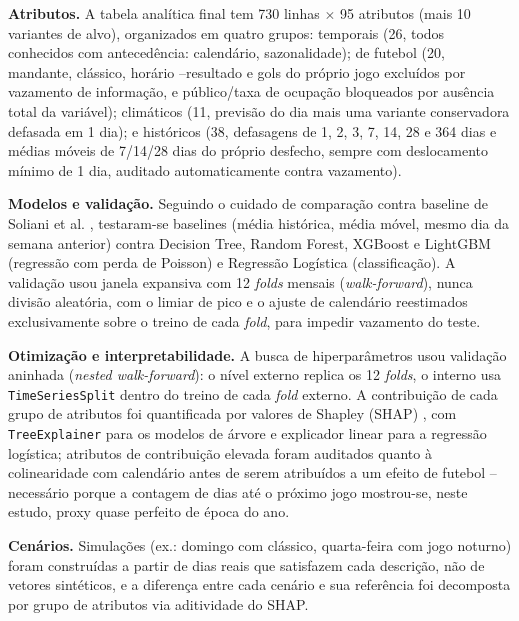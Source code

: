 \textbf{Atributos.} A tabela analítica final tem 730 linhas $\times$ 95
atributos (mais 10 variantes de alvo), organizados em quatro grupos:
temporais (26, todos conhecidos com antecedência: calendário,
sazonalidade); de futebol (20, mandante, clássico, horário --resultado e
gols do próprio jogo excluídos por vazamento de informação, e
público/taxa de ocupação bloqueados por ausência total da variável);
climáticos (11, previsão do dia mais uma variante conservadora defasada
em 1 dia); e históricos (38, defasagens de 1, 2, 3, 7, 14, 28 e 364 dias e
médias móveis de 7/14/28 dias do próprio desfecho, sempre com
deslocamento mínimo de 1 dia, auditado automaticamente contra
vazamento).

\textbf{Modelos e validação.} Seguindo o cuidado de comparação contra
baseline de Soliani et al. \cite{soliani2024}, testaram-se baselines
(média histórica, média móvel, mesmo dia da semana anterior) contra
Decision Tree, Random Forest, XGBoost \cite{chen2016} e LightGBM
(regressão com perda de Poisson) e Regressão Logística (classificação).
A validação usou janela expansiva com 12 \emph{folds} mensais
(\emph{walk-forward}), nunca divisão aleatória, com o limiar de pico e o
ajuste de calendário reestimados exclusivamente sobre o treino de cada
\emph{fold}, para impedir vazamento do teste.

\textbf{Otimização e interpretabilidade.} A busca de hiperparâmetros usou
validação aninhada (\emph{nested walk-forward}): o nível externo replica
os 12 \emph{folds}, o interno usa \texttt{TimeSeriesSplit} dentro do
treino de cada \emph{fold} externo. A contribuição de cada grupo de
atributos foi quantificada por valores de Shapley (SHAP)
\cite{lundberg2017}, com \texttt{TreeExplainer} para os modelos de árvore
e explicador linear para a regressão logística; atributos de contribuição
elevada foram auditados quanto à colinearidade com calendário antes de
serem atribuídos a um efeito de futebol -- necessário porque a contagem de
dias até o próximo jogo mostrou-se, neste estudo, proxy quase perfeito de
época do ano.

\textbf{Cenários.} Simulações (ex.: domingo com clássico, quarta-feira com
jogo noturno) foram construídas a partir de dias reais que satisfazem cada
descrição, não de vetores sintéticos, e a diferença entre cada cenário e
sua referência foi decomposta por grupo de atributos via aditividade do
SHAP.
